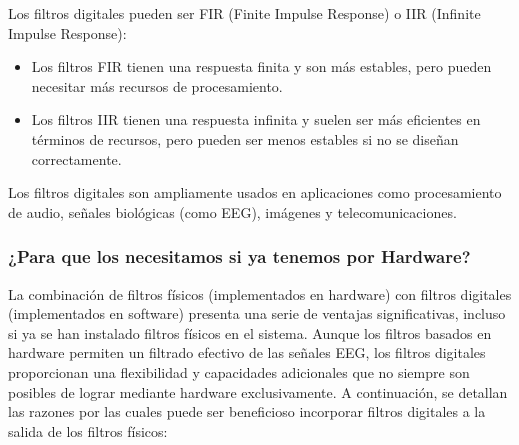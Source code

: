 \documentclass{article}
\begin{document}
Los filtros digitales pueden ser FIR (Finite Impulse Response) o IIR (Infinite Impulse Response):

\begin{itemize}
    \item Los filtros FIR tienen una respuesta finita y son más estables, pero pueden necesitar más recursos de procesamiento.
    \item Los filtros IIR tienen una respuesta infinita y suelen ser más eficientes en términos de recursos, pero pueden ser menos estables si no se diseñan correctamente.
\end{itemize}

Los filtros digitales son ampliamente usados en aplicaciones como procesamiento de audio, señales biológicas (como EEG), imágenes y telecomunicaciones.
\subsubsection{¿Para que los necesitamos si ya tenemos por Hardware?}
La combinación de filtros físicos (implementados en hardware) con filtros digitales (implementados en software) presenta una serie de ventajas significativas, incluso si ya se han instalado filtros físicos en el sistema. Aunque los filtros basados en hardware permiten un filtrado efectivo de las señales EEG, los filtros digitales proporcionan una flexibilidad y capacidades adicionales que no siempre son posibles de lograr mediante hardware exclusivamente. A continuación, se detallan las razones por las cuales puede ser beneficioso incorporar filtros digitales a la salida de los filtros físicos:
\end{document}

